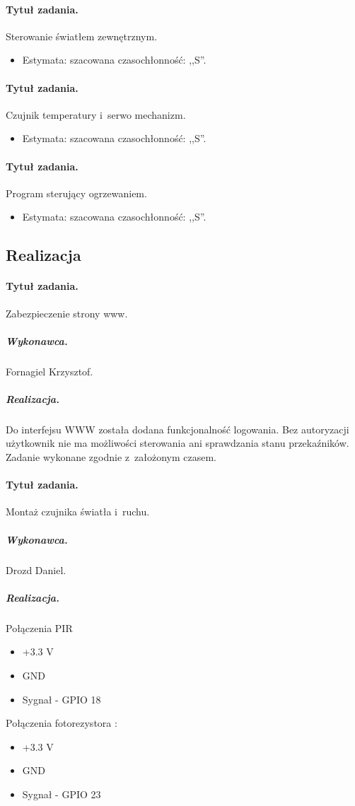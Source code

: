 \paragraph{Tytuł zadania.} Sterowanie światłem zewnętrznym.
\begin{itemize}
	\item Estymata: szacowana czasochłonność: ,,S''.
\end{itemize}

\paragraph{Tytuł zadania.} Czujnik temperatury i~serwo mechanizm.
\begin{itemize}
	\item Estymata: szacowana czasochłonność: ,,S''.
\end{itemize}

\paragraph{Tytuł zadania.} Program sterujący ogrzewaniem.
\begin{itemize}
	\item Estymata: szacowana czasochłonność: ,,S''.
\end{itemize}


\subsection{Realizacja}

\paragraph{Tytuł zadania.} Zabezpieczenie strony www.
\subparagraph{Wykonawca.} Fornagiel Krzysztof.
\subparagraph{Realizacja.} Do interfejsu WWW została dodana funkcjonalność logowania. Bez autoryzacji użytkownik nie ma możliwości sterowania ani sprawdzania stanu przekaźników. Zadanie wykonane zgodnie z~założonym czasem.

\paragraph{Tytuł zadania.} Montaż czujnika światła i~ruchu.
\subparagraph{Wykonawca.} Drozd Daniel.
\subparagraph{Realizacja.} 	Połączenia PIR 

\begin{itemize}
	\item +3.3 V
	\item GND
	\item Sygnał - GPIO 18
\end{itemize}
Połączenia fotorezystora :
\begin{itemize}
	\item +3.3 V
	\item GND
	\item Sygnał - GPIO 23
\end{itemize}

